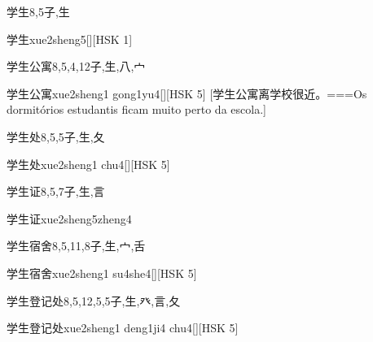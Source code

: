 \begin{Entry}{学生}{8,5}{⼦,⽣}
  \begin{Phonetics}{学生}{xue2sheng5}[][HSK 1]
  \end{Phonetics}
\end{Entry}

\begin{Entry}{学生公寓}{8,5,4,12}{⼦,⽣,⼋,⼧}
  \begin{Phonetics}{学生公寓}{xue2sheng1 gong1yu4}[][HSK 5]
    [学生公寓离学校很近。===Os dormitórios estudantis ficam muito perto da escola.]
  \end{Phonetics}
\end{Entry}

\begin{Entry}{学生处}{8,5,5}{⼦,⽣,⼡}
  \begin{Phonetics}{学生处}{xue2sheng1 chu4}[][HSK 5]
  \end{Phonetics}
\end{Entry}

\begin{Entry}{学生证}{8,5,7}{⼦,⽣,⾔}
  \begin{Phonetics}{学生证}{xue2sheng5zheng4}
  \end{Phonetics}
\end{Entry}

\begin{Entry}{学生宿舍}{8,5,11,8}{⼦,⽣,⼧,⾆}
  \begin{Phonetics}{学生宿舍}{xue2sheng1 su4she4}[][HSK 5]
  \end{Phonetics}
\end{Entry}

\begin{Entry}{学生登记处}{8,5,12,5,5}{⼦,⽣,⽨,⾔,⼡}
  \begin{Phonetics}{学生登记处}{xue2sheng1 deng1ji4 chu4}[][HSK 5]
  \end{Phonetics}
\end{Entry}

